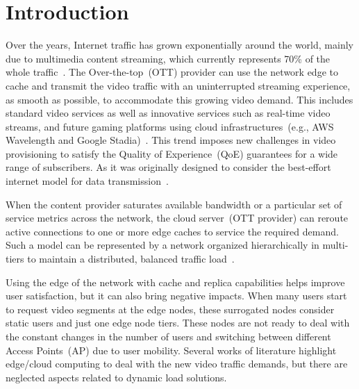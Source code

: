 \section{Introduction}
\label{sec:introduction}


Over the years, Internet traffic has grown exponentially around the world, mainly due to multimedia content streaming, which currently represents 70\% of the whole traffic~\cite{cisco:forecast}. 
The Over-the-top~(OTT) provider can use the network edge to cache and transmit the video traffic with an uninterrupted streaming experience, as smooth as possible, to accommodate this growing video demand. This includes standard video services as well as innovative services such as real-time video streams, and future gaming platforms using cloud infrastructures~(e.g., AWS Wavelength and Google Stadia)~\cite{amzo:AWSEdge}.
This trend imposes new challenges in video provisioning to satisfy the Quality of Experience~(QoE) guarantees for a wide range of subscribers. As it was originally designed to consider the best-effort internet model for data transmission~\cite{gamaUCC2019, DBLP:CoRR:2021, ye:ITC17}.

When the content provider saturates available bandwidth or a particular set of service metrics across the network, the cloud server~(OTT provider) can reroute active connections to one or more edge caches to service the required demand. Such a model can be represented by a network organized hierarchically in multi-tiers to maintain a distributed, balanced traffic load~\cite{rosarioSENSORS2018}.

Using the edge of the network with cache and replica capabilities helps improve user satisfaction, but it can also bring negative impacts. When many users start to request video segments at the edge nodes, these surrogated nodes consider static users and just one edge node tiers. These nodes are not ready to deal with the constant changes in the number of users and switching between different Access Points~(AP) due to user mobility.
Several works of literature highlight edge/cloud computing to deal with the new video traffic demands, but there are neglected aspects related to dynamic load solutions. 


